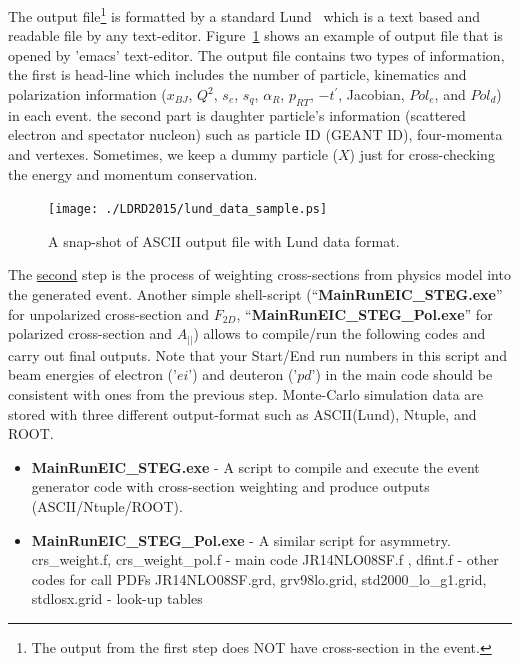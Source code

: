 \documentclass[12pt,letterpaper]{article}
\begin{document}
\fontsize{12}{12}
The output file\footnote{The output from the first step does NOT have cross-section in the event.} is formatted by a standard Lund~\cite{LundWeb} which is a text based and readable file by any text-editor. Figure~\ref{fig:LunDataFormat} shows an example of output file that is opened by 'emacs' text-editor. The output file contains two types of information, the first is head-line which includes  the number of particle, kinematics and polarization information ($x_{BJ}$, $Q^2$, $s_e$, $s_q$, $\alpha_R$, $p_{RT}$, $-t^{\prime}$, Jacobian, $Pol_e$, and $Pol_d$) in each event. the second part is daughter particle's information (scattered electron and spectator nucleon) such as particle ID (GEANT ID), four-momenta and vertexes.  Sometimes, we keep a dummy particle ($X$) just for cross-checking the energy and momentum conservation.\\
\begin{figure}[h]
\hspace{-20mm}
        \texttt{[image: ./LDRD2015/lund\_data\_sample.ps]}
        \caption[Lund Format]{ A snap-shot of ASCII output file with Lund data format.
          \label{fig:LunDataFormat}
        }
\end{figure}
%
%
%

The \underline{second} step is the process of weighting cross-sections from physics model into the generated event. Another simple shell-script (``\textbf{MainRunEIC\_STEG.exe}'' for unpolarized cross-section and $F_{2D}$, ``\textbf{MainRunEIC\_STEG\_Pol.exe}'' for polarized cross-section and $A_{||}$) allows to compile/run the following codes and carry out final outputs. Note that your Start/End run numbers in this script and beam energies of electron ('$ei$') and deuteron ('$pd$') in the main code should be consistent with ones from the previous step. Monte-Carlo simulation data are stored with three different output-format such as ASCII(Lund), Ntuple, and ROOT.\\
\begin{itemize}
\item{} \textbf{MainRunEIC\_STEG.exe} - A script to compile and execute the event generator code with cross-section weighting and produce outputs (ASCII/Ntuple/ROOT).
\item{} \textbf{MainRunEIC\_STEG\_Pol.exe} - A similar script for asymmetry.
 crs\_weight.f,  crs\_weight\_pol.f  - main code
 JR14NLO08SF.f , dfint.f  - other codes for call PDFs
 JR14NLO08SF.grd, grv98lo.grid, std2000\_lo\_g1.grid, stdlosx.grid  - look-up tables
\end{itemize}
\end{document}
